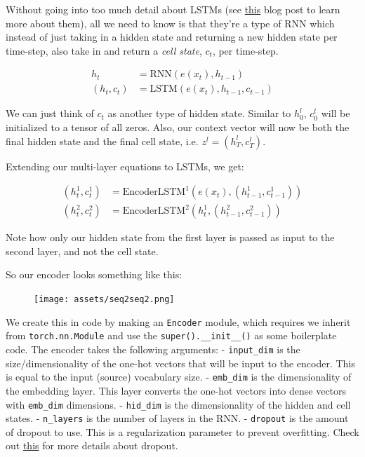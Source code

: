 \documentclass[11pt]{article}
\begin{document}
Without going into too much detail about LSTMs (see
\href{https://colah.github.io/posts/2015-08-Understanding-LSTMs/}{this}
blog post to learn more about them), all we need to know is that they're
a type of RNN which instead of just taking in a hidden state and
returning a new hidden state per time-step, also take in and return a
\emph{cell state}, \(c_t\), per time-step.

\[\begin{align*}
h_t &= \text{RNN}(e(x_t), h_{t-1})\\
(h_t, c_t) &= \text{LSTM}(e(x_t), h_{t-1}, c_{t-1})
\end{align*}\]

We can just think of \(c_t\) as another type of hidden state. Similar to
\(h_0^l\), \(c_0^l\) will be initialized to a tensor of all zeros. Also,
our context vector will now be both the final hidden state and the final
cell state, i.e. \(z^l = (h_T^l, c_T^l)\).

Extending our multi-layer equations to LSTMs, we get:

\[\begin{align*}
(h_t^1, c_t^1) &= \text{EncoderLSTM}^1(e(x_t), (h_{t-1}^1, c_{t-1}^1))\\
(h_t^2, c_t^2) &= \text{EncoderLSTM}^2(h_t^1, (h_{t-1}^2, c_{t-1}^2))
\end{align*}\]

Note how only our hidden state from the first layer is passed as input
to the second layer, and not the cell state.

So our encoder looks something like this:

\begin{figure}
\centering
\texttt{[image: assets/seq2seq2.png]}
\caption{}
\end{figure}

We create this in code by making an \texttt{Encoder} module, which
requires we inherit from \texttt{torch.nn.Module} and use the
\texttt{super().\_\_init\_\_()} as some boilerplate code. The encoder
takes the following arguments: - \texttt{input\_dim} is the
size/dimensionality of the one-hot vectors that will be input to the
encoder. This is equal to the input (source) vocabulary size. -
\texttt{emb\_dim} is the dimensionality of the embedding layer. This
layer converts the one-hot vectors into dense vectors with
\texttt{emb\_dim} dimensions. - \texttt{hid\_dim} is the dimensionality
of the hidden and cell states. - \texttt{n\_layers} is the number of
layers in the RNN. - \texttt{dropout} is the amount of dropout to use.
This is a regularization parameter to prevent overfitting. Check out
\href{https://www.coursera.org/lecture/deep-neural-network/understanding-dropout-YaGbR}{this}
for more details about dropout.
\end{document}
